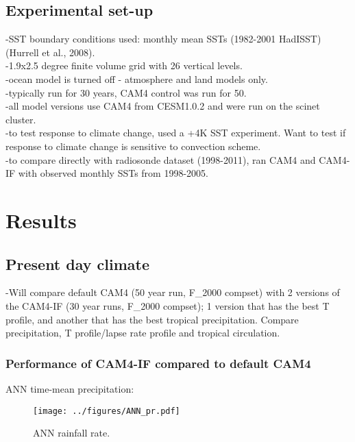 \documentclass[letterpaper,12pt,titlepage,oneside,final]{book}
\begin{document}
\section{Experimental set-up}
-SST boundary conditions used: monthly mean SSTs (1982-2001 HadISST) (Hurrell et al., 2008).
\\
-1.9x2.5 degree finite volume grid with 26 vertical levels.
\\
-ocean model is turned off - atmosphere and land models only.
\\
-typically run for 30 years, CAM4 control was run for 50. 
\\
-all model versions use CAM4 from CESM1.0.2 and were run on the scinet cluster.
\\
-to test response to climate change, used a +4K SST experiment. Want to test if response to climate change is sensitive to convection scheme.
\\
-to compare directly with radiosonde dataset (1998-2011), ran CAM4 and CAM4-IF with observed monthly SSTs from 1998-2005. 
\chapter{Results}
\section{Present day climate}
-Will compare default CAM4 (50 year run, F\_2000 compset) with 2 versions of the CAM4-IF (30 year runs, F\_2000 compset); 1 version that has the best T profile, and another that has the best tropical precipitation. Compare precipitation, T profile/lapse rate profile and tropical circulation.
\subsection{Performance of CAM4-IF compared to default CAM4}
ANN time-mean precipitation:
\begin{figure}[H]
\centering
\noindent\texttt{[image: ../figures/ANN\_pr.pdf]}\hfill
\caption{ANN rainfall rate.}
\end{figure}
\newpage
\end{document}
